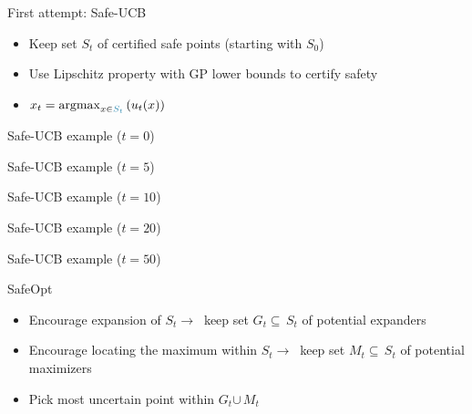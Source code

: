 \documentclass[xetex,10pt,mathserif,handout]{beamer}
\newlength\figureheight
\newlength\figurewidth
\newcommand{\localucb}{{\sc\textsf{Safe-UCB}}\xspace}
\newcommand{\cst}{{\color{cyan!70!black}$S_t$}\xspace}
\newcommand{\ccst}{{\color{cyan!70!black}S_t}\xspace}
\newcommand{\cgt}{{\color{lime!70!black}$G_t$}\xspace}
\newcommand{\cmt}{{\color{orange!70!black}$M_t$}\xspace}
\begin{document}
\begin{frame}{First attempt: \localucb}
\begin{itemize}
  \item<1-> Keep set \cst of certified safe points (starting with $S_0$)
  \vspace{2em}
  \item<2-> Use Lipschitz property with GP lower bounds to certify safety
  \vspace{2em}
  \item<3-> $x_t = \argmax_{x \in \ccst} \left( u_t(x) \right)$
\end{itemize}
\end{frame}

\begin{frame}{\localucb example ($t = 0$)}
\centering
\setlength\figurewidth{5in}
\setlength\figureheight{3.5in}

\end{frame}

\begin{frame}{\localucb example ($t = 5$)}
\centering
\setlength\figurewidth{5in}
\setlength\figureheight{3.5in}

\end{frame}

\begin{frame}{\localucb example ($t = 10$)}
\centering
\setlength\figurewidth{5in}
\setlength\figureheight{3.5in}

\end{frame}

\begin{frame}{\localucb example ($t = 20$)}
\centering
\setlength\figurewidth{5in}
\setlength\figureheight{3.5in}

\end{frame}

\begin{frame}{\localucb example ($t = 50$)}
\centering
\setlength\figurewidth{5in}
\setlength\figureheight{3.5in}

\end{frame}

\begin{frame}{SafeOpt}
\begin{itemize}
  \item<1-> Encourage expansion of \cst $\rightarrow\ $ keep set \cgt$\subseteq\,$\cst of potential expanders
  \vspace{2em}
  \item<2-> Encourage locating the maximum within \cst $\rightarrow\ $ keep set \cmt$\subseteq\,$\cst of potential maximizers
  \vspace{2em}
  \item<3-> Pick most uncertain point within \cgt$\cup\,$\cmt
\end{itemize}
\end{frame}
\end{document}
